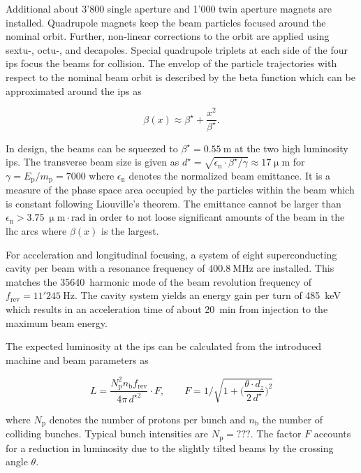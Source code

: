 Additional about 3'800 single aperture and 1'000 twin aperture magnets are installed. Quadrupole magnets keep the beam particles focused around the nominal orbit. Further, non-linear corrections to the orbit are applied using sextu-, octu-, and decapoles. Special quadrupole triplets at each side of the four \glspl{ip} focus the beams for collision. The envelop of the particle trajectories with respect to the nominal beam orbit is described by the beta function which can be approximated around the \glspl{ip} as 

\begin{equation}
\beta(x)\approx\beta^\star+\frac{x^2}{\beta^\star}.
\end{equation}

In design, the beams can be squeezed to $\beta^\star=0.55~\mathrm{m}$ at the two high luminosity \glspl{ip}. The transverse beam size is given as $d^{\star}=\sqrt{\epsilon_\mathrm{n}\cdot\beta^\star/\gamma}\approx17\upmu\mathrm{m}$ for $\gamma=E_\mathrm{p}/m_\mathrm{p}=7000$ where $\epsilon_\mathrm{n}$ denotes the normalized beam emittance. It is a measure of the phase space area occupied by the particles within the beam which is constant following Liouville's theorem. The emittance cannot be larger than $\epsilon_\mathrm{n}>3.75~\upmu\mathrm{m}\cdot\mathrm{rad}$ in order to not loose significant amounts of the beam in the \gls{lhc} arcs where $\beta(x)$ is the largest.

For acceleration and longitudinal focusing, a system of eight superconducting cavity per beam with a resonance frequency of $400.8~\mathrm{MHz}$ are installed. This matches the 35640~harmonic mode of the beam revolution frequency of $f_\mathrm{rev}=11'245~\mathrm{Hz}$. The cavity system yields an energy gain per turn of 485~keV which results in an acceleration time of about 20~min from injection to the maximum beam energy.

The expected luminosity at the \glspl{ip} can be calculated from the introduced machine and beam parameters as

\begin{equation}
L=\frac{N_\mathrm{p}^{2}n_\mathrm{b}f_\mathrm{rev}}{4\pi\,d^{\star 2}}\cdot F,\qquad F=1\Bigg/\sqrt{1+\Big(\frac{\theta\cdot d_{z}}{2\,d^\star}\Big)^2}
\end{equation}

where $N_\mathrm{p}$ denotes the number of protons per bunch and $n_\mathrm{b}$ the number of colliding bunches. Typical bunch intensities are $N_\mathrm{p}=???$.  The factor $F$ accounts for a reduction in luminosity due to the slightly tilted beams by the crossing angle $\theta$.

